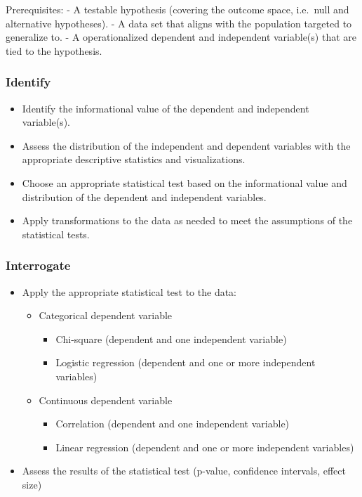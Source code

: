 \documentclass[
  letterpaper,
]{scrbook}
\providecommand{\tightlist}{%
  \setlength{\itemsep}{0pt}\setlength{\parskip}{0pt}}\usepackage{longtable,booktabs,array}
\begin{document}
Prerequisites: - A testable hypothesis (covering the outcome space,
i.e.~null and alternative hypotheses). - A data set that aligns with the
population targeted to generalize to. - A operationalized dependent and
independent variable(s) that are tied to the hypothesis.

\hypertarget{ida-identify}{%
\subsubsection{Identify}\label{ida-identify}}

\begin{itemize}
\tightlist
\item
  Identify the informational value of the dependent and independent
  variable(s).
\item
  Assess the distribution of the independent and dependent variables
  with the appropriate descriptive statistics and visualizations.
\item
  Choose an appropriate statistical test based on the informational
  value and distribution of the dependent and independent variables.
\item
  Apply transformations to the data as needed to meet the assumptions of
  the statistical tests.
\end{itemize}

\hypertarget{ida-interrogate}{%
\subsubsection{Interrogate}\label{ida-interrogate}}

\begin{itemize}
\tightlist
\item
  Apply the appropriate statistical test to the data:

  \begin{itemize}
  \tightlist
  \item
    Categorical dependent variable

    \begin{itemize}
    \tightlist
    \item
      Chi-square (dependent and one independent variable)
    \item
      Logistic regression (dependent and one or more independent
      variables)
    \end{itemize}
  \item
    Continuous dependent variable

    \begin{itemize}
    \tightlist
    \item
      Correlation (dependent and one independent variable)
    \item
      Linear regression (dependent and one or more independent
      variables)
    \end{itemize}
  \end{itemize}
\item
  Assess the results of the statistical test (p-value, confidence
  intervals, effect size)
\end{itemize}
\end{document}

